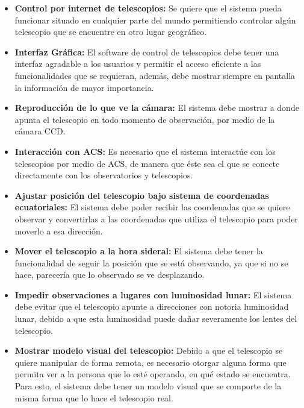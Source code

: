 \documentclass[letterpaper,spanish,10pt]{article}
\begin{document}
	\begin{itemize}
	\item \textbf{Control por internet de telescopios:} Se quiere que el sistema 
pueda funcionar situado en cualquier parte del mundo permitiendo controlar alg\'un 
telescopio que se encuentre en otro lugar geogr\'afico.

	\item \textbf{Interfaz Gr\'afica:} El software de control de telescopios debe 
tener una interfaz agradable a los usuarios y permitir el acceso eficiente a las 
funcionalidades que se requieran, adem\'as, debe mostrar siempre en pantalla la 
informaci\'on de mayor importancia.

	\item \textbf{Reproducci\'on de lo que ve la c\'amara:} El sistema debe 
mostrar a donde apunta el telescopio en todo momento de observaci\'on, por medio de 
la c\'amara CCD.

	\item \textbf{Interacci\'on con ACS:} Es necesario que el sistema interact\'ue con 
los telescopios por medio de ACS, de manera que \'este sea el que se conecte 
directamente con los observatorios y telescopios.

	\item \textbf{Ajustar posici\'on del telescopio bajo sistema de coordenadas 
ecuatoriales:} El sistema debe poder recibir las coordenadas que se quiere observar 
y convertirlas a las coordenadas que utiliza el telescopio para poder moverlo a esa 
direcci\'on.

	\item \textbf{Mover el telescopio a la hora sideral:} El sistema debe tener la 
funcionalidad de seguir la posici\'on que se est\'a observando, ya que si no se 
hace, parecer\'ia que lo observado se ve desplazando.

	\item \textbf{Impedir observaciones a lugares con luminosidad lunar:} El sistema 
debe evitar que el telescopio apunte a direcciones con notoria luminosidad lunar, 
debido a que esta luminosidad puede da\~nar severamente los lentes del telescopio.

	\item \textbf{Mostrar modelo visual del telescopio:} Debido a que el telescopio se 
quiere manipular de forma remota, es necesario otorgar alguna forma que permita 
ver a la persona que lo est\'e operando, en qu\'e estado se encuentra. Para esto, 
el sistema debe tener un modelo visual que se comporte de la misma forma que lo 
hace el telescopio real.


\end{itemize}
\end{document}
